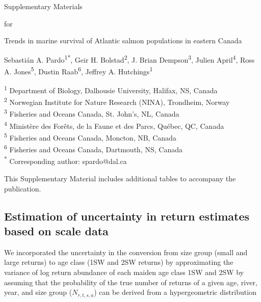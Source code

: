 \documentclass[12pt]{article}
\newcommand{\beginsupplement}{%
        \setcounter{table}{0}
        \renewcommand{\thetable}{S\arabic{table}}%
        \setcounter{figure}{0}
        \renewcommand{\thefigure}{S\arabic{figure}}%
     }
\begin{document}
\linenumbers


\noindent
{\Large Supplementary Materials}
\newline

\noindent
{\Large for}
\newline

\noindent
{\large Trends in marine survival of Atlantic salmon populations in eastern Canada}
\newline

\noindent
Sebasti\'{a}n A. Pardo\textsuperscript{1*}, Geir H. Bolstad\textsuperscript{2}, J. Brian Dempson\textsuperscript{3}, 
        Julien April\textsuperscript{4}, Ross A. Jones\textsuperscript{5}, %
        Dustin Raab\textsuperscript{6}, Jeffrey A. Hutchings\textsuperscript{1}
\newline

\noindent
\small{\textsuperscript{1} Department of Biology, Dalhousie University, Halifax, NS, Canada\\}
\small{\textsuperscript{2} Norwegian Institute for Nature Research (NINA), Trondheim, Norway\\}
\small{\textsuperscript{3} Fisheries and Oceans Canada, St. John's, NL, Canada\\}
\small{\textsuperscript{4} Minist\`{e}re des For\^{e}ts, de la Faune et des Parcs, Qu\'{e}bec, QC, Canada\\}
\small{\textsuperscript{5} Fisheries and Oceans Canada, Moncton, NB, Canada\\}
\small{\textsuperscript{6} Fisheries and Oceans Canada, Dartmouth, NS, Canada\\}
\small{\textsuperscript{*} Corresponding author: spardo@dal.ca}
\beginsupplement

This Supplementary Material includes additional tables to accompany the publication. 

\clearpage

\subsection*{Estimation of uncertainty in return estimates based on scale data}

We incorporated the uncertainty in the conversion from size group (small and large returns) to age class (1SW and 2SW returns) by 
approximating the variance of log return abundance of each maiden age class 1SW and 2SW by assuming that the probability 
of the true number of returns of a given age, river, year, and size group ($N_{r,t,s,a}$) can be derived from a hypergeometric distribution
\end{document}
